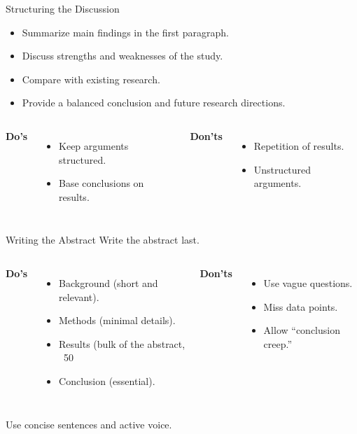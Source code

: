 \begin{frame}{Structuring the Discussion}
  \begin{itemize}
    \item Summarize main findings in the first paragraph.
      \pause
    \item Discuss strengths and weaknesses of the study.
      \pause
    \item Compare with existing research.
      \pause
    \item Provide a balanced conclusion and future research directions.
  \end{itemize}
  \pause

  \vspace{1cm}
  \begin{columns}
    \textbf{Do's}
    \begin{itemize}
      \item Keep arguments structured.
      \item Base conclusions on results.
    \end{itemize}
    \alert{\textbf{Don'ts}}
    \begin{itemize}
      \item Repetition of results.
      \item Unstructured arguments.
    \end{itemize}
  \end{columns}
\end{frame}

\begin{frame}{Writing the Abstract}
  Write the abstract last.
  \pause

  \vspace{0.5cm}
  \begin{columns}
    \textbf{Do's}
    \begin{itemize}
      \item Background (short and relevant).
      \item Methods (minimal details).
      \item Results (bulk of the abstract, ~50%
      \item Conclusion (essential).
    \end{itemize}
    \pause
    \alert{\textbf{Don'ts}}
    \begin{itemize}
      \item Use vague questions.
      \item Miss data points.
      \item Allow “conclusion creep.”
    \end{itemize}
  \end{columns}

  \pause
  \vspace{0.5cm}

  Use concise sentences and active voice.
\end{frame}
